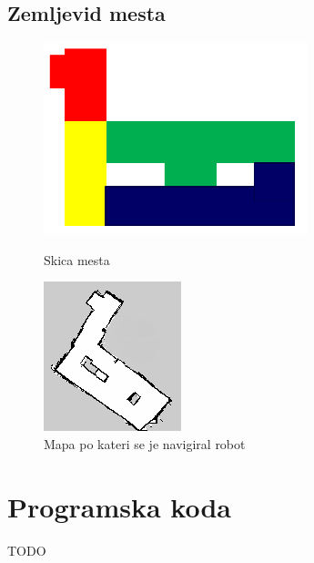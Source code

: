 \documentclass[a4paper,11pt]{article}
\begin{document}
\subsection{Zemljevid mesta}
\begin{figure}[!tbp]
  \centering
  \begin{minipage}[b]{0.2\textwidth}
	\includegraphics[scale=0.6]{city.png}
	\caption{Skica mesta}
  \end{minipage}
  \hfill
  \begin{minipage}[b]{0.2\textwidth}
	\includegraphics[scale=1]{robotMap.png}
	\caption{Mapa po kateri se je navigiral robot}
  \end{minipage}
\end{figure}



\section{\label{app-code}Programska koda}

TODO
\end{document}
